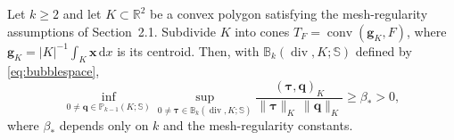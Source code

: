\documentclass[review,hidelinks,onefignum,onetabnum]{siamart251216}
\renewcommand{\div}{\operatorname{div}}
\begin{document}
\begin{theorem}
\label{thm:bm-convex-polygons}
Let $k\ge2$ and let $K\subset\mathbb R^2$ be a convex polygon satisfying
the mesh-regularity assumptions of Section~2.1. Subdivide $K$ into cones
$T_F=\operatorname{conv}(\boldsymbol g_K,F)$, where
$\boldsymbol g_K=|K|^{-1}\int_K\boldsymbol x\,\mathrm dx$ is its centroid.
Then, with $\mathbb B_k(\div,K;\mathbb S)$ defined by
\eqref{eq:bubblespace},
\begin{equation}\label{eq:bm-centroid-conclusion}
\inf_{0\ne\boldsymbol q\in\mathbb P_{k-1}(K;\mathbb S)}
\sup_{0\ne\boldsymbol\tau\in\mathbb B_k(\div,K;\mathbb S)}
\frac{(\boldsymbol\tau,\boldsymbol q)_K}
{\|\boldsymbol\tau\|_K\,\|\boldsymbol q\|_K}
\ge\beta_*>0,
\end{equation}
where $\beta_*$ depends only on $k$ and the mesh-regularity constants.
\end{theorem}
\end{document}
